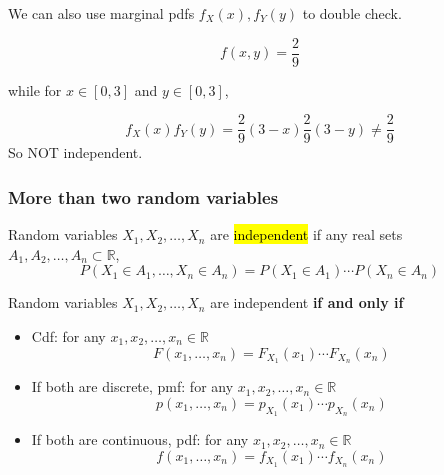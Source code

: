 \documentclass[slidestop,compress,mathserif]{beamer}
\begin{document}
\begin{frame}
We can also use marginal pdfs $f_X(x), f_Y(y)$ to double check.

\pause
$$f(x, y) = \frac{2}{9}$$ 

while for $x \in [0, 3]$ and $y \in [0, 3]$,

$$f_X(x)f_Y(y) = \frac{2}{9}(3 - x) \frac{2}{9}(3 - y) \neq \frac{2}{9}$$
\pause So NOT independent.\\
\end{frame}

\begin{frame}\frametitle{More than two random variables}
\begin{dinglist}{\DingListSymbolA}
\item Random variables $X_1, X_2, \ldots, X_n$ are \hl{independent} if any real sets $A_1, A_2, \ldots, A_n \subset \mathbb{R}$,
\[P(X_1 \in A_1,  \ldots, X_n \in A_n) = P(X_1 \in A_1) \cdots P(X_n \in A_n)\]
\end{dinglist}

Random variables $X_1, X_2, \ldots, X_n$ are independent {\bf if and only if}
\begin{itemize}
\item Cdf: for any $x_1, x_2, \ldots, x_n \in \mathbb{R}$
\[F(x_1, \ldots, x_n) = F_{X_1}(x_1)\cdots F_{X_n}(x_n)\]
\item  If both are discrete, pmf: for any $x_1, x_2, \ldots, x_n \in \mathbb{R}$
\[p(x_1, \ldots, x_n) = p_{X_1}(x_1)\cdots p_{X_n}(x_n)\]
\item If both are continuous, pdf: for any $x_1, x_2, \ldots, x_n \in \mathbb{R}$
\[f(x_1, \ldots, x_n) = f_{X_1}(x_1)\cdots f_{X_n}(x_n)\]

\end{itemize}
\end{frame}
\end{document}

